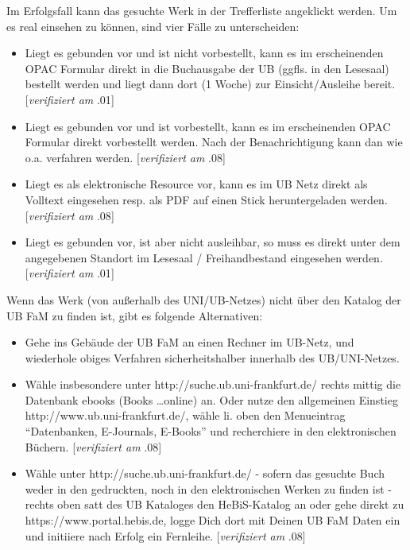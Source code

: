 \documentclass[
  DIV=calc,
  BCOR=5mm,
  11pt,
  headings=small,
  oneside,
  abstract=true,
  toc=bib,
  english,ngerman]{scrartcl}
\begin{document}
Im Erfolgsfall kann das gesuchte Werk in der Trefferliste angeklickt werden. Um
es real einsehen zu können, sind vier Fälle zu unterscheiden:
\begin{itemize}
  \item Liegt es gebunden vor und ist nicht vorbestellt, kann es im
  erscheinenden OPAC Formular direkt in die Buchausgabe der UB (ggfls. in den
  Lesesaal) bestellt werden und liegt dann dort (1 Woche) zur
  Einsicht/Ausleihe bereit. [\emph{verifiziert am} {.01}]
  \item Liegt es gebunden vor und ist vorbestellt, kann es im erscheinenden OPAC
  Formular direkt vorbestellt werden. Nach der Benachrichtigung kann dan wie
  o.a. verfahren werden.  [\emph{verifiziert am} {.08}]
  \item Liegt es als elektronische Resource vor, kann es im UB Netz direkt als
  Volltext eingesehen resp. als PDF auf einen Stick heruntergeladen werden. 
  [\emph{verifiziert am} {.08}]
  \item Liegt es gebunden vor, ist aber nicht ausleihbar, so muss es direkt
  unter dem angegebenen Standort im Lesesaal / Freihandbestand eingesehen werden. 
  [\emph{verifiziert am} {.01}]
\end{itemize}

Wenn das Werk (von außerhalb des UNI/UB-Netzes) nicht über den Katalog der
UB FaM zu finden ist, gibt es folgende Alternativen:

\begin{itemize}
  \item Gehe ins Gebäude der UB FaM an einen Rechner im UB-Netz, und wiederhole
  obiges Verfahren sicherheitshalber innerhalb des UB/UNI-Netzes. 
  \item Wähle
  insbesondere unter {\ttfamily http://suche.ub.uni-frankfurt.de/} rechts mittig
  die Datenbank ebooks (Books \ldots online) an. Oder nutze den allgemeinen
  Einstieg {\ttfamily http://www.ub.uni-frankfurt.de/}, wähle li. oben den
  Menueintrag \enquote{Datenbanken, E-Journals, E-Books} und recherchiere
  in den elektronischen Büchern.  [\emph{verifiziert am} {.08}]
  \item Wähle unter {\ttfamily http://suche.ub.uni-frankfurt.de/} - sofern das
  gesuchte Buch weder in den gedruckten, noch in den elektronischen Werken zu
  finden ist - rechts oben satt des UB Kataloges den HeBiS-Katalog an oder gehe
  direkt zu {\ttfamily https://www.portal.hebis.de}, logge Dich dort mit Deinen
  UB FaM Daten ein und initiiere nach Erfolg ein Fernleihe.  [\emph{verifiziert
  am} {.08}]
\end{itemize}
\end{document}
